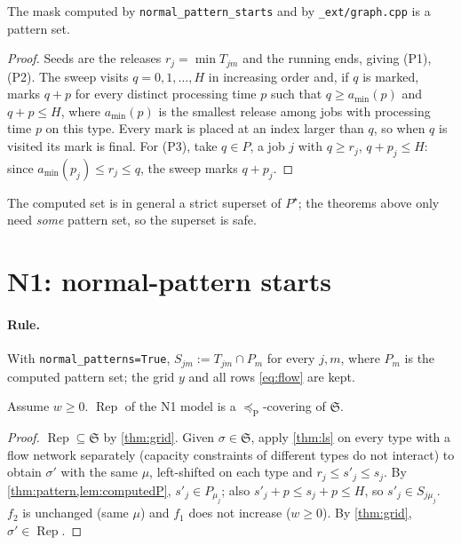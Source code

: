 \documentclass[11pt,a4paper]{article}
\newcommand{\Sched}{\mathfrak{S}}
\newcommand{\Rep}{\operatorname{Rep}}
\newcommand{\code}[1]{\texttt{#1}}
\newcommand{\preceqP}{\preceq_{\mathrm{P}}}
\begin{document}
\begin{lemma}\label{lem:computedP}
The mask computed by \code{normal\_pattern\_starts} and by
\code{\_ext/graph.cpp} is a pattern set.
\end{lemma}
\begin{proof}
Seeds are the releases $r_j=\min T_{jm}$ and the running ends, giving (P1),
(P2). The sweep visits $q=0,1,\dots,H$ in increasing order and, if $q$ is
marked, marks $q+p$ for every distinct processing time $p$ such that
$q\ge a_{\min}(p)$ and $q+p\le H$, where $a_{\min}(p)$ is the smallest release
among jobs with processing time $p$ on this type. Every mark is placed at an
index larger than $q$, so when $q$ is visited its mark is final. For (P3),
take $q\in P$, a job $j$ with $q\ge r_j$, $q+p_j\le H$: since
$a_{\min}(p_j)\le r_j\le q$, the sweep marks $q+p_j$.
\end{proof}
The computed set is in general a strict superset of $P^\star$; the theorems
above only need \emph{some} pattern set, so the superset is safe.

\section{N1: normal-pattern starts}\label{sec:N1}

\paragraph{Rule.} With \code{normal\_patterns=True}, $S_{jm}:=T_{jm}\cap P_m$
for every $j,m$, where $P_m$ is the computed pattern set; the grid $y$ and all
rows \eqref{eq:flow} are kept.

\begin{theorem}\label{thm:N1}
Assume $w\ge0$. $\Rep$ of the N1 model is a $\preceqP$-covering of $\Sched$.
\end{theorem}
\begin{proof}
$\Rep\subseteq\Sched$ by \cref{thm:grid}. Given $\sigma\in\Sched$, apply
\cref{thm:ls} on every type with a flow network separately (capacity
constraints of different types do not interact) to obtain $\sigma'$ with the
same $\mu$, left-shifted on each type and $r_j\le s'_j\le s_j$. By
\cref{thm:pattern,lem:computedP}, $s'_j\in P_{\mu_j}$; also
$s'_j+p\le s_j+p\le H$, so $s'_j\in S_{j\mu_j}$. $f_2$ is unchanged (same
$\mu$) and $f_1$ does not increase ($w\ge0$). By \cref{thm:grid},
$\sigma'\in\Rep$.
\end{proof}
\end{document}
